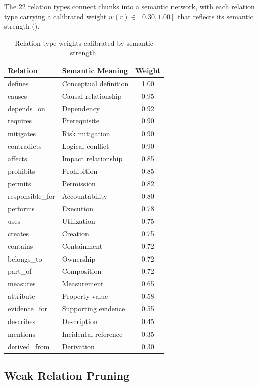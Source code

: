 \documentclass[11pt]{article}
\begin{document}
The 22 relation types connect chunks into a semantic network, with each relation type carrying a calibrated weight $w(r) \in [0.30, 1.00]$ that reflects its semantic strength ().

\begin{table}[htbp]
\centering
\caption{Relation type weights calibrated by semantic strength.}
\label{tab:edge-weights}
\begin{tabular}{@{}llc@{}}
\toprule
\textbf{Relation} & \textbf{Semantic Meaning} & \textbf{Weight} \\
\midrule
defines & Conceptual definition & 1.00 \\
causes & Causal relationship & 0.95 \\
depends\_on & Dependency & 0.92 \\
requires & Prerequisite & 0.90 \\
mitigates & Risk mitigation & 0.90 \\
contradicts & Logical conflict & 0.90 \\
affects & Impact relationship & 0.85 \\
prohibits & Prohibition & 0.85 \\
permits & Permission & 0.82 \\
responsible\_for & Accountability & 0.80 \\
performs & Execution & 0.78 \\
uses & Utilization & 0.75 \\
creates & Creation & 0.75 \\
contains & Containment & 0.72 \\
belongs\_to & Ownership & 0.72 \\
part\_of & Composition & 0.72 \\
measures & Measurement & 0.65 \\
attribute & Property value & 0.58 \\
evidence\_for & Supporting evidence & 0.55 \\
describes & Description & 0.45 \\
mentions & Incidental reference & 0.35 \\
derived\_from & Derivation & 0.30 \\
\bottomrule
\end{tabular}
\end{table}

\subsection{Weak Relation Pruning}
\end{document}
